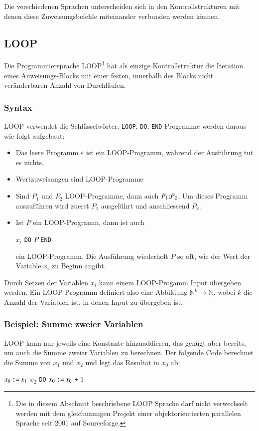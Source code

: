 Die verschiedenen Sprachen unterscheiden sich in den Kontrollstrukturen
mit denen diese Zuweisungsbefehle miteinander verbunden werden können.

\subsection{LOOP}
%
Die Programmiersprache
LOOP\footnote{Die in diesem Abschnitt beschriebene
LOOP Sprache darf nicht verwechselt werden mit dem gleichnamigen
Projekt einer objektorientierten parallelen Sprache seit
2001 auf Sourceforge.}
hat als einzige Kontrollstruktur die
Iteration eines Anweisungs-Blocks mit einer festen, innerhalb des
Blocks nicht veränderbaren Anzahl von Durchläufen.

\subsubsection{Syntax}
LOOP verwendet die 
Schlüsselwörter: {\tt LOOP}, {\tt DO}, {\tt END}
Programme werden daraus wie folgt aufgebaut:
\begin{itemize}
\item Das leere Programm $\varepsilon$ ist ein LOOP-Programm,
während der Ausführung tut es nichts.
\item Wertzuweisungen sind LOOP-Programme
\item Sind $P_1$ und $P_2$ LOOP-Programme, dann auch
$P_1{\tt ;}P_2$.
Um dieses Programm auszuführen wird zuerst $P_1$
ausgeführt und anschliessend $P_2$.
\item Ist $P$ ein LOOP-Programm, dann ist auch
\begin{algorithmic}
 $x_i$ {\tt DO} $P$ {\tt END}
\end{algorithmic}
ein LOOP-Programm.
Die Ausführung wiederholt $P$ so oft, wie der
Wert der Variable $x_i$  zu Beginn angibt.
\end{itemize}
Durch Setzen der Variablen $x_i$ kann einem LOOP-Progamm Input übergeben
werden.
Ein LOOP-Programm definiert also eine Abbildung $\mathbb N^k\to\mathbb N$,
wobei $k$ die Anzahl der Variablen ist, in denen Input zu übergeben ist.

\subsubsection{Beispiel: Summe zweier Variablen}
LOOP kann nur jeweils eine Konstante hinzuaddieren, das genügt aber
bereits, um auch die Summe zweier Variablen zu berechnen.
Der folgende
Code berechnet die Summe von $x_1$ und $x_2$ und legt das Resultat in
$x_0$ ab:
\begin{algorithmic}
\STATE $x_0 \mathbin{\texttt{:=}} x_1$
 $x_2$ {\tt DO}
\STATE{\tt \ \ \ \ }$x_0 \mathbin{\texttt{:=}} x_0$ {\tt +} $1$
\end{algorithmic}

